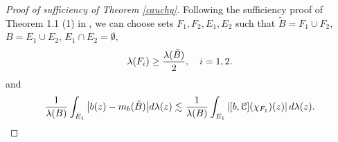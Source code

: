 \documentclass[11pt,a4paper]{amsart}
\numberwithin{equation}{section}
\begin{document}
{\begin{proof}[Proof of sufficiency of Theorem \ref{cauchy}]
Following the sufficiency proof of Theorem 1.1 (1) in \cite{DLLWW},
 we can choose sets $F_{1}, F_{2}, E_{1}, E_{2}$ such that $\tilde B=F_{1}\cup F_{2}$, $B=E_{1}\cup E_{2}$, $E_{1}\cap E_{2}=\emptyset$,
\begin{align}\label{f1f2-1 1}
\lambda(F_{i}) \geq{\lambda(\tilde B)\over 2},\quad i=1,2.
\end{align}
and
\begin{align*}
{1\over \lambda(B)}\int_{E_{1}}\big|b(z)-m_b(\tilde B)\big|d\lambda(z)\lesssim {1\over \lambda(B)}\int_{E_{1}}\left|[b, \EuScript C](\chi_{F_1})(z)\right|d\lambda(z).
\end{align*}
%

\end{proof}}
\end{document}
